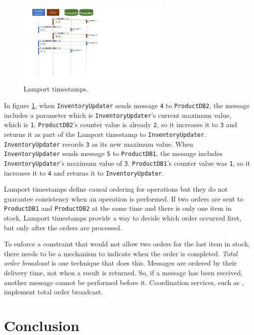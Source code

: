 \begin{figure}[h!]
    \centering
    \includegraphics[trim=60 189 450 35,clip,width=0.67\textwidth]{diagrams/lamport-timestamp-seq.png}
    \caption{Lamport timestamps.}
    \label{fig:lamport-timestamp-seq}
\end{figure}

In figure \ref{fig:lamport-timestamp-seq}, when \texttt{InventoryUpdater} sends message \texttt{4} to \texttt{ProductDB2},
the message includes a parameter which is \texttt{InventoryUpdater}'s current maximum value, which is \texttt{1}.
\texttt{ProductDB2}'s counter value is already \texttt{2},
so it increases it to \texttt{3} and returns it as part of the Lamport timestamp to \texttt{InventoryUpdater}.
\texttt{InventoryUpdater} records \texttt{3} as its new maximum value.
When \texttt{InventoryUpdater} sends message \texttt{5} to \texttt{ProductDB1},
the message includes \texttt{InventoryUpdater}'s maximum value of \texttt{3}.
\texttt{ProductDB1}'s counter value was \texttt{1}, so it increases it to \texttt{4} and returns it to \texttt{InventoryUpdater}.

Lamport timestamps define causal ordering for operations but they do not guarantee consistency when an operation is performed.
If two orders are sent to \texttt{ProductDB1} and \texttt{ProductDB2} at the same time and there is only one item in stock,
Lamport timestamps provide a way to decide which order occurred first, but only after the orders are processed.

To enforce a constraint that would not allow two orders for the last item in stock,
there needs to be a mechanism to indicate when the order is completed.
\emph{Total order broadcast} is one technique that does this.
Messages are ordered by their delivery time, not when a result is returned.
So, if a message has been received, another message cannot be performed before it.
Coordination services, such as , implement total order broadcast.


\section{Conclusion}

